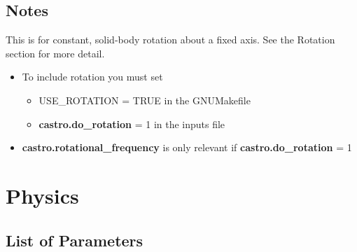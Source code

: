 \subsection{Notes}
This is for constant, solid-body rotation about a fixed axis.  See the Rotation section for more detail.
\begin{itemize}
\item To include rotation you must set
\begin{itemize}
\item USE\_ROTATION = TRUE in the GNUMakefile
\item {\bf castro.do\_rotation} = 1 in the inputs file
\end{itemize}
\item {\bf castro.rotational\_frequency} is only relevant if {\bf castro.do\_rotation} = 1
\end{itemize}

\section{Physics}

\subsection{List of Parameters}

